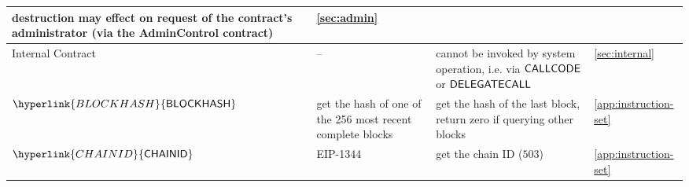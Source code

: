 \begin{center}
\begin{tabu}{l X X l}
			destruction may effect on request of the contract's administrator
			(via the AdminControl contract) & \cref{sec:admin}\\
			\midrule
			Internal Contract & -- & cannot be invoked by system operation, i.e. via $\mathsf{CALLCODE}$ or $\mathsf{DELEGATECALL}$  
			& \cref{sec:internal} \smallskip\\
			\hline
			$\hyperlink{BLOCKHASH}{\op{BLOCKHASH}}$ 	&  get the hash of one of the 256 most recent complete blocks	& get the hash of the last block, return zero if querying other blocks	& \cref{app:instruction-set}\\
			\hline
			$\hyperlink{CHAINID}{\op{CHAINID}}$ 	& EIP-1344	&  get the {\name} chain ID ($503$)	&  \cref{app:instruction-set}\\
			\bottomrule

	\end{tabu}
\end{center}